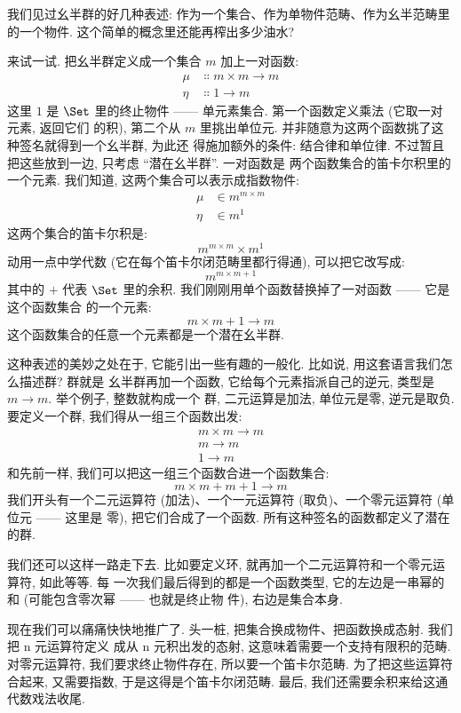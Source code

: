 
\lettrine[lhang=0.17]{我}{们见过幺半群的好几种表述}: 作为一个集合、作为单物件范畴、作为幺半范畴里
的一个物件. 这个简单的概念里还能再榨出多少油水?

来试一试. 把幺半群定义成一个集合 $m$ 加上一对函数:
\begin{align*}
  \mu  & \Colon m\times{}m \to m \\
  \eta & \Colon 1 \to m
\end{align*}
这里 $1$ 是 $\Set$ 里的终止物件 —— 单元素集合. 第一个函数定义乘法 (它取一对元素, 返回它们
的积), 第二个从 $m$ 里挑出单位元. 并非随意为这两个函数挑了这种签名就得到一个幺半群, 为此还
得施加额外的条件: 结合律和单位律. 不过暂且把这些放到一边, 只考虑 ``潜在幺半群''. 一对函数是
两个函数集合的笛卡尔积里的一个元素. 我们知道, 这两个集合可以表示成指数物件:
\begin{align*}
  \mu  & \in m^{m\times{}m} \\
  \eta & \in m^1
\end{align*}
这两个集合的笛卡尔积是:
\[m^{m\times{}m}\times{}m^1\]
动用一点中学代数 (它在每个笛卡尔闭范畴里都行得通), 可以把它改写成:
\[m^{m\times{}m + 1}\]
其中的 $+$ 代表 $\Set$ 里的余积. 我们刚刚用单个函数替换掉了一对函数 —— 它是这个函数集合
的一个元素:
\[m\times{}m + 1 \to m\]
这个函数集合的任意一个元素都是一个潜在幺半群.

这种表述的美妙之处在于, 它能引出一些有趣的一般化. 比如说, 用这套语言我们怎么描述群? 群就是
幺半群再加一个函数, 它给每个元素指派自己的逆元, 类型是 $m \to m$. 举个例子, 整数就构成一个
群, 二元运算是加法, 单位元是零, 逆元是取负. 要定义一个群, 我们得从一组三个函数出发:
\begin{align*}
  m\times{}m \to m \\
  m \to m          \\
  1 \to m
\end{align*}
和先前一样, 我们可以把这一组三个函数合进一个函数集合:
\[m\times{}m + m + 1 \to m\]
我们开头有一个二元运算符 (加法)、一个一元运算符 (取负)、一个零元运算符 (单位元 —— 这里是
零), 把它们合成了一个函数. 所有这种签名的函数都定义了潜在的群.

我们还可以这样一路走下去. 比如要定义环, 就再加一个二元运算符和一个零元运算符, 如此等等. 每
一次我们最后得到的都是一个函数类型, 它的左边是一串幂的和 (可能包含零次幂 —— 也就是终止物
件), 右边是集合本身.

现在我们可以痛痛快快地推广了. 头一桩, 把集合换成物件、把函数换成态射. 我们把 n 元运算符定义
成从 n 元积出发的态射, 这意味着需要一个支持有限积的范畴. 对零元运算符, 我们要求终止物件存在,
所以要一个笛卡尔范畴. 为了把这些运算符合起来, 又需要指数, 于是这得是个笛卡尔闭范畴. 最后,
我们还需要余积来给这通代数戏法收尾.

